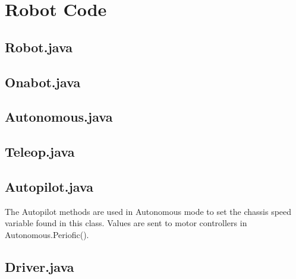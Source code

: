 \documentclass[letterpaper,10pt]{memoir}
\newcommand{\filelister}[1]{%
		
	}
\begin{document}
% 


% 


\newpage\chapter{Robot Code}

	\newpage\section*{Robot.java}
	\filelister{Robot.java}

	\newpage\section*{Onabot.java}
	\filelister{Mode/Onabot.java}

	\newpage\section*{Autonomous.java}
	\filelister{Mode/Autonomous.java}


	\newpage\section*{Teleop.java}
	\filelister{Mode/Teleop.java}

	\newpage\section*{Autopilot.java}
	
	The Autopilot methods are used in Autonomous mode to set the chassis speed variable found in this class. Values are sent to motor controllers in Autonomous.Periofic().
	
	\filelister{Hardware/Autopilot.java}

	\newpage\section*{Driver.java}
	\filelister{Hardware/Driver.java}
\end{document}
